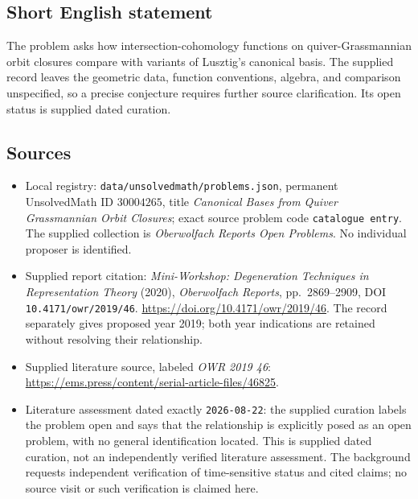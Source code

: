 \documentclass[11pt]{article}
\begin{document}
\subsection{Short English statement}
The problem asks how intersection-cohomology functions on quiver-Grassmannian orbit closures compare with variants of Lusztig's canonical basis. The supplied record leaves the geometric data, function conventions, algebra, and comparison unspecified, so a precise conjecture requires further source clarification. Its open status is supplied dated curation.
\subsection{Sources}
\begin{itemize}
\item Local registry: \texttt{data/unsolvedmath/problems.json}, permanent UnsolvedMath ID \(30004265\), title \emph{Canonical Bases from Quiver Grassmannian Orbit Closures}; exact source problem code \texttt{catalogue entry}. The supplied collection is \emph{Oberwolfach Reports Open Problems}. No individual proposer is identified.
\item Supplied report citation: \emph{Mini-Workshop: Degeneration Techniques in Representation Theory} (2020), \emph{Oberwolfach Reports}, pp.\ 2869--2909, DOI \texttt{10.4171/owr/2019/46}. \url{https://doi.org/10.4171/owr/2019/46}. The record separately gives proposed year 2019; both year indications are retained without resolving their relationship.
\item Supplied literature source, labeled \emph{OWR 2019 46}: \url{https://ems.press/content/serial-article-files/46825}.
\item Literature assessment dated exactly \texttt{2026-08-22}: the supplied curation labels the problem open and says that the relationship is explicitly posed as an open problem, with no general identification located. This is supplied dated curation, not an independently verified literature assessment. The background requests independent verification of time-sensitive status and cited claims; no source visit or such verification is claimed here.
\end{itemize}
\end{document}
